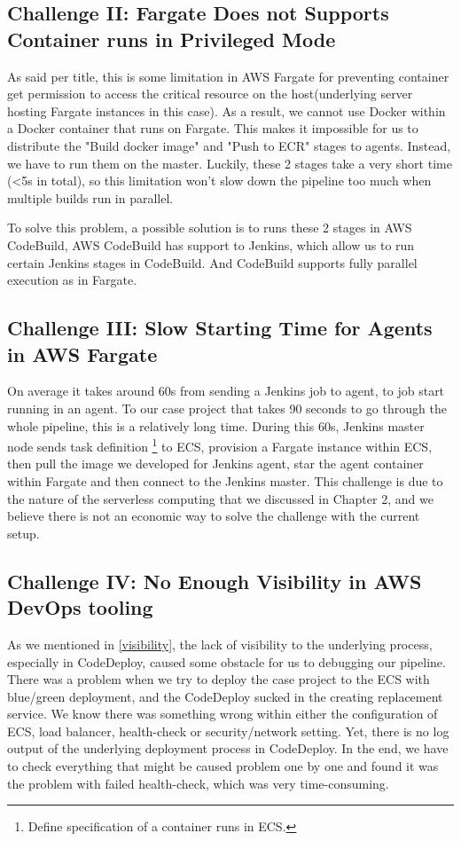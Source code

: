\subsection{Challenge II: Fargate Does not Supports Container runs in Privileged Mode}
As said per title, this is some limitation in AWS Fargate for preventing container get permission to access the critical resource on the host(underlying server hosting Fargate instances in this case). As a result, we cannot use Docker within a Docker container that runs on Fargate. This makes it impossible for us to distribute the "Build docker image" and "Push to ECR" stages to agents. Instead, we have to run them on the master. Luckily, these 2 stages take a very short time (<5s in total), so this limitation won't slow down the pipeline too much when multiple builds run in parallel.
\par
To solve this problem, a possible solution is to runs these 2 stages in AWS CodeBuild, AWS CodeBuild has support to Jenkins, which allow us to run certain Jenkins stages in CodeBuild. And CodeBuild supports fully parallel execution as in Fargate.
\subsection{Challenge III: Slow Starting Time for Agents in AWS Fargate}
On average it takes around 60s from sending a Jenkins job to agent, to job start running in an agent. To our case project that takes 90 seconds to go through the whole pipeline, this is a relatively long time. During this 60s, Jenkins master node sends task definition \footnote{Define specification of a container runs in ECS.} to ECS, provision a Fargate instance within ECS, then pull the image we developed for Jenkins agent, star the agent container within Fargate and then connect to the Jenkins master. This challenge is due to the nature of the serverless computing that we discussed in Chapter 2, and we believe there is not an economic way to solve the challenge with the current setup.
\subsection{Challenge IV: No Enough Visibility in AWS DevOps tooling}
As we mentioned in \ref{visibility}, the lack of visibility to the underlying process, especially in CodeDeploy, caused some obstacle for us to debugging our pipeline. There was a problem when we try to deploy the case project to the ECS with blue/green deployment, and the CodeDeploy sucked in the creating replacement service. We know there was something wrong within either the configuration of ECS, load balancer, health-check or security/network setting. Yet, there is no log output of the underlying deployment process in CodeDeploy. In the end, we have to check everything that might be caused problem one by one and found it was the problem with failed health-check, which was very time-consuming.